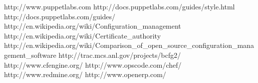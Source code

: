\begin{thebibliography}{99}

http://www.puppetlabs.com
http://docs.puppetlabs.com/guides/style.html
http://docs.puppetlabs.com/guides/
http://en.wikipedia.org/wiki/Configuration\_management
http://en.wikipedia.org/wiki/Certificate\_authority
http://en.wikipedia.org/wiki/Comparison\_of\_open\_source\_configuration\_management\_software
http://trac.mcs.anl.gov/projects/bcfg2/
http://www.cfengine.org/
http://www.opscode.com/chef/
http://www.redmine.org/
http://www.openerp.com/

\end{thebibliography}
